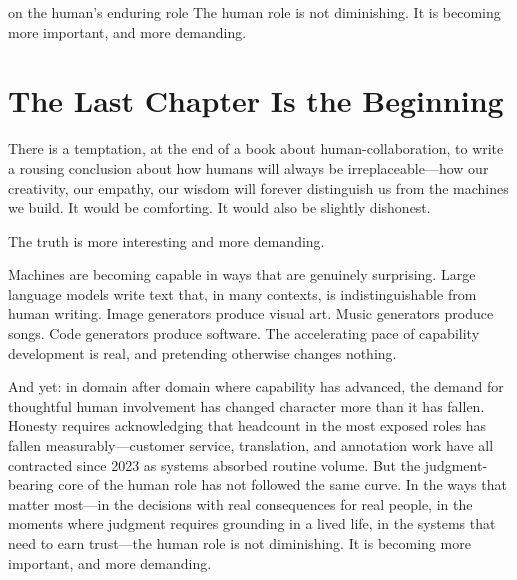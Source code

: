 
\label{chap:ch19}
\begin{chapterquote}{on the human's enduring role}
The human role is not diminishing. It is becoming more important, and more demanding.
\end{chapterquote}

\section{The Last Chapter Is the Beginning}
\label{sec:ch19-opening}

There is a temptation, at the end of a book about human-\ai collaboration, to write a rousing conclusion about how humans will always be irreplaceable---how our creativity, our empathy, our wisdom will forever distinguish us from the machines we build. It would be comforting. It would also be slightly dishonest.

The truth is more interesting and more demanding.

Machines are becoming capable in ways that are genuinely surprising. Large language models write text that, in many contexts, is indistinguishable from human writing. Image generators produce visual art. Music generators produce songs. Code generators produce software. The accelerating pace of \ai capability development is real, and pretending otherwise changes nothing.

And yet: in domain after domain where \ai capability has advanced, the demand for thoughtful human involvement has changed character more than it has fallen. Honesty requires acknowledging that headcount in the most exposed roles has fallen measurably---customer service, translation, and annotation work have all contracted since 2023 as \ai systems absorbed routine volume. But the judgment-bearing core of the human role has not followed the same curve. In the ways that matter most---in the decisions with real consequences for real people, in the moments where judgment requires grounding in a lived life, in the systems that need to earn trust---the human role is not diminishing. It is becoming more important, and more demanding.


